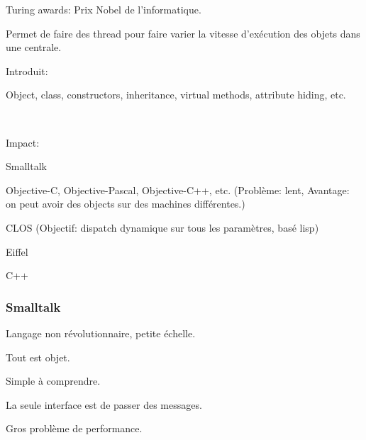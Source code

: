 \documentclass[a4paper,11pt]{article}
\begin{document}
Turing awards: Prix Nobel de l'informatique.

Permet de faire des thread pour faire varier la vitesse d'exécution des objets
dans une centrale.

Introduit:

Object, class, constructors, inheritance, virtual methods, attribute hiding, etc.

\

Impact:

Smalltalk

Objective-C, Objective-Pascal, Objective-C++, etc. (Problème: lent, Avantage: on
peut avoir des objects sur des machines différentes.)

CLOS (Objectif: dispatch dynamique sur tous les paramètres, basé lisp)

Eiffel

C++

\subsubsection{Smalltalk}

Langage non révolutionnaire, petite échelle.

Tout est objet.

Simple à comprendre.

La seule interface est de passer des messages.

Gros problème de performance.
\end{document}
